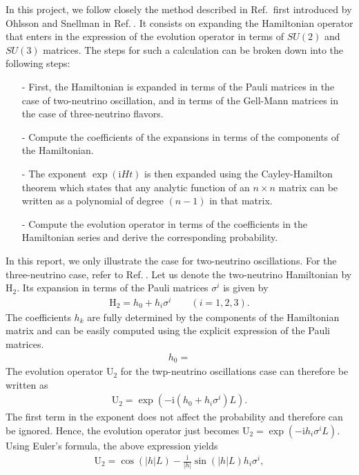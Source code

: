 \documentclass[twocolumn,secnumarabic,amssymb, nobibnotes, aps, prd,10pt]{revtex4-1}
\newcommand{\myref}[1]{Ref.$\:$\cite{#1}}
\begin{document}
In this project, we follow closely the method described in \myref{} first introduced
by Ohlsson and Snellman in \myref{}. It consists on expanding the Hamiltonian operator 
that enters in the expression of the evolution operator in terms of $SU(2)$ and $SU(3)$ 
matrices. The steps for such a calculation can be broken down into the following steps:
\begin{itemize}
\item[-] First, the Hamiltonian is expanded in terms of the Pauli matrices in the case of
two-neutrino oscillation, and in terms of the Gell-Mann matrices in the case of 
three-neutrino flavors.
\item[-] Compute the coefficients of the expansions in terms of the components of the
Hamiltonian.
\item[-] The exponent $\exp (\mathrm{i} H t)$ is then expanded using the Cayley-Hamilton theorem
which states that any analytic function of an $n \times n$ matrix can be written as a 
polynomial of degree $(n-1)$ in that matrix.
\item[-] Compute the evolution operator in terms of the coefficients in the Hamiltonian
series and derive the corresponding probability.
\end{itemize}
In this report, we only illustrate the case for two-neutrino oscillations. For the 
three-neutrino case, refer to \myref{}. Let us denote the two-neutrino Hamiltonian
by $\mathrm{H}_2$. Its expansion in terms of the Pauli matrices $\sigma^i$ is given by
\begin{align}
\mathrm{H}_2 = h_0 + h_i \sigma^i \quad \quad (i=1,2,3).
\end{align}
The coefficients $h_k$ are fully determined by the components of the Hamiltonian matrix
and can be easily computed using the explicit expression of the Pauli matrices.
\begin{align}
h_0 = 
\end{align}
The evolution operator $\mathrm{U}_2$ for the twp-neutrino oscillations case can
therefore be written as
\begin{align}
\mathrm{U}_2 = \exp \left( - \mathrm{i} (h_0 + h_i \sigma^i) L \right).
\end{align}
The first term in the exponent does not affect the probability and therefore can be 
ignored. Hence, the evolution operator just becomes $\mathrm{U}_2 = \exp (- \mathrm{i}
h_i \sigma^i L)$. Using Euler's formula, the above expression yields
\begin{align}
\mathrm{U}_2 = \cos (\vert h \vert L) -  \frac{\mathrm{i}}
{\vert h \vert} \sin (\vert h \vert L) h_i \sigma^i ,
\end{align}
\end{document}
